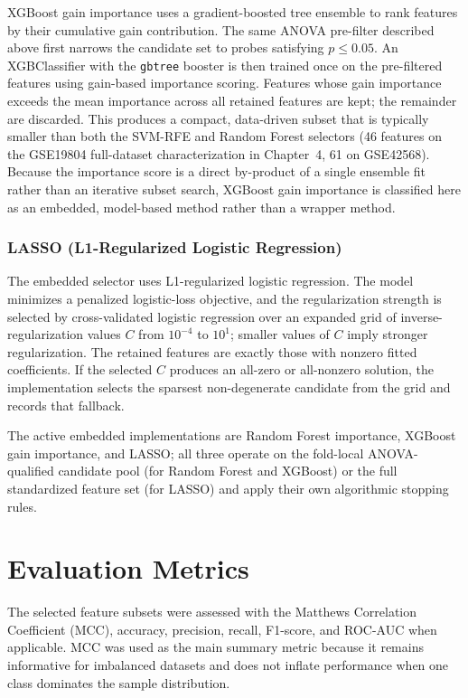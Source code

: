 XGBoost gain importance uses a gradient-boosted tree ensemble to rank features by their cumulative gain contribution. The same ANOVA pre-filter described above first narrows the candidate set to probes satisfying $p \leq 0.05$. An XGBClassifier with the \texttt{gbtree} booster is then trained once on the pre-filtered features using gain-based importance scoring. Features whose gain importance exceeds the mean importance across all retained features are kept; the remainder are discarded. This produces a compact, data-driven subset that is typically smaller than both the SVM-RFE and Random Forest selectors (46 features on the GSE19804 full-dataset characterization in Chapter~4, 61 on GSE42568). Because the importance score is a direct by-product of a single ensemble fit rather than an iterative subset search, XGBoost gain importance is classified here as an embedded, model-based method rather than a wrapper method.

\subsubsection{LASSO (L1-Regularized Logistic Regression)}

The embedded selector uses L1-regularized logistic regression. The model minimizes a penalized logistic-loss objective, and the regularization strength is selected by cross-validated logistic regression over an expanded grid of inverse-regularization values $C$ from $10^{-4}$ to $10^{1}$; smaller values of $C$ imply stronger regularization. The retained features are exactly those with nonzero fitted coefficients. If the selected $C$ produces an all-zero or all-nonzero solution, the implementation selects the sparsest non-degenerate candidate from the grid and records that fallback.

The active embedded implementations are Random Forest importance, XGBoost gain importance, and LASSO; all three operate on the fold-local ANOVA-qualified candidate pool (for Random Forest and XGBoost) or the full standardized feature set (for LASSO) and apply their own algorithmic stopping rules.

\section{Evaluation Metrics}

The selected feature subsets were assessed with the Matthews Correlation Coefficient (MCC), accuracy, precision, recall, F1-score, and ROC-AUC when applicable. MCC was used as the main summary metric because it remains informative for imbalanced datasets and does not inflate performance when one class dominates the sample distribution.

